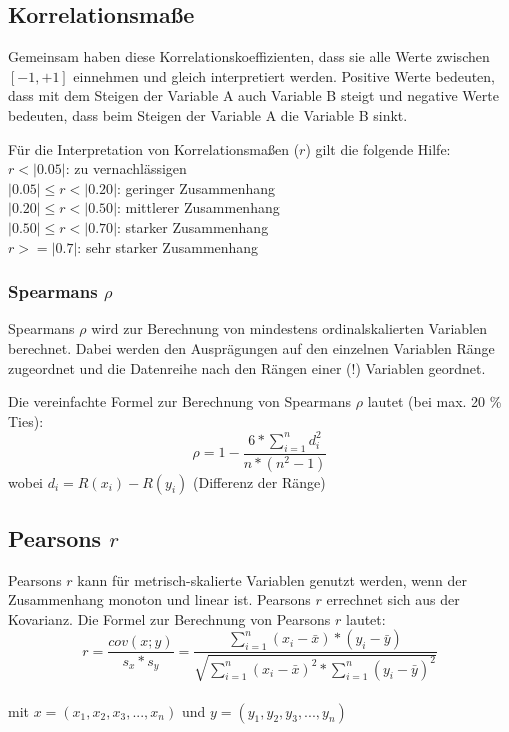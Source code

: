 \documentclass[11pt,a4paper]{article}
\begin{document}
\subsection{Korrelationsmaße}
Gemeinsam haben diese Korrelationskoeffizienten, dass sie alle Werte zwischen $[-1, +1]$ einnehmen und gleich interpretiert werden. Positive Werte bedeuten, dass mit dem Steigen der Variable A auch Variable B steigt und negative Werte bedeuten, dass beim Steigen der Variable A die Variable B sinkt.

Für die Interpretation von Korrelationsmaßen ($r$) gilt die folgende Hilfe: \\
$r < |0.05|$: zu vernachlässigen\\
$|0.05| \leq r < |0.20|$: geringer Zusammenhang \\
$|0.20| \leq r < |0.50|$: mittlerer Zusammenhang \\
$|0.50| \leq r < |0.70|$: starker Zusammenhang\\
$r >= |0.7|$: sehr starker Zusammenhang

\subsubsection{Spearmans \texorpdfstring{$\rho$}{rho}}
Spearmans $\rho$ wird zur Berechnung von mindestens ordinalskalierten Variablen berechnet. Dabei werden den Ausprägungen auf den einzelnen Variablen Ränge zugeordnet und die Datenreihe nach den Rängen einer (!) Variablen geordnet. 

Die vereinfachte Formel zur Berechnung von Spearmans $\rho$ lautet (bei max. 20 \% Ties):\\
$$\rho = 1 - \frac {6 \ast \sum\limits_{i=1}^n d^2_i} {n \ast (n^2 - 1)}$$
wobei $d_i = R(x_i) - R(y_i)$ (Differenz der Ränge) \\

\subsection{Pearsons $r$}
Pearsons $r$ kann für metrisch-skalierte Variablen genutzt werden, wenn der Zusammenhang monoton und linear ist. Pearsons $r$ errechnet sich aus der Kovarianz. 
Die Formel zur Berechnung von Pearsons $r$ lautet:\\
$$r= \frac {cov(x;y)}{s_x \ast s_y} = \frac {\sum\limits_{i=1} ^n (x_i - \bar{x}) \ast (y_i - \bar{y})} {\sqrt {\sum \limits_{i=1} ^n (x_i - \bar{x})^2 \ast \sum \limits_{i=1} ^n (y_i - \bar{y})^2}}$$ \\
mit $x = (x_1, x_2, x_3, ..., x_n)$ und $y = (y_1, y_2, y_3, ..., y_n)$\\
\end{document}
